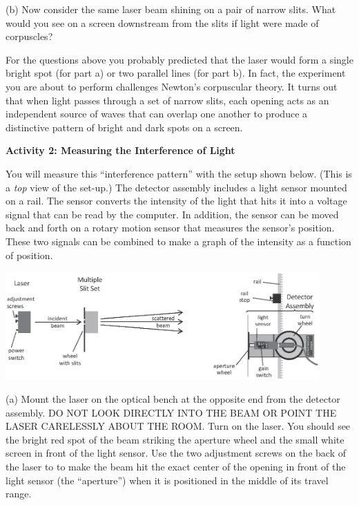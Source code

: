 (b) Now consider the same laser beam shining on a pair of narrow slits.
What would you see on a screen downstream from the slits if light
were made of corpuscles?
\answerspace{35mm}

\pagebreak[2]
For the questions above you probably predicted that the laser would
form a single bright spot (for part a) or two parallel lines (for part
b).  In fact, the experiment you are about to perform challenges Newton's corpuscular theory. 
It turns out that when light passes through a set of narrow slits, each opening acts as an independent
source of waves that can overlap one another to produce a distinctive
pattern of bright and dark spots on a screen. 

\bigskip

\textbf{Activity 2: Measuring the Interference of Light }

You will measure this ``interference pattern'' with the setup shown below. 
(This is a \textit{top} view of the set-up.) 
The detector assembly includes a light sensor mounted on a rail. The sensor converts the intensity 
of the light that hits it into a voltage signal that can be read by the
computer. In addition, the sensor can be moved back and
forth on a rotary motion sensor that measures the sensor's position. These two signals can be combined to
make a graph of the intensity as a function of position.

\answerspace{0.3cm}
\begin{center}
\includegraphics[width=0.90\textwidth]{interference_of_light/apparatus.eps}
\end{center}
\label{figure_rail_stop}
\answerspace{0.3cm}

(a) Mount the laser on the 
optical bench at the opposite end from the detector assembly.
DO NOT LOOK DIRECTLY INTO
THE BEAM OR POINT THE LASER CARELESSLY ABOUT THE ROOM.  Turn on the
laser.  You should see the bright red spot of the beam striking
the aperture wheel and the small white screen in front of the light sensor. 
Use the two adjustment screws on the back of the laser to to make the beam hit the exact center of the opening in front of the light sensor (the ``aperture'') when it is positioned in the middle of its travel range.  

